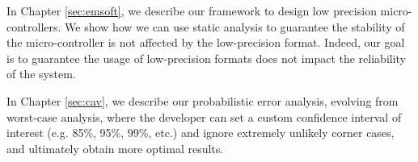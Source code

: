 %
%
%
%
In Chapter \ref{sec:emsoft}, we describe our framework to design low precision micro-controllers.
%
We show how we can use static analysis to guarantee the stability of the micro-controller is not affected by the low-precision format.
%
Indeed, our goal is to guarantee the usage of low-precision formats does not impact the reliability of the system.

%
%

%
%
%
In Chapter \ref{sec:cav}, we describe our probabilistic error analysis, evolving from worst-case analysis, where the developer can set a custom confidence interval of interest (e.g. 85\%, 95\%, 99\%, etc.) and ignore extremely unlikely corner cases, and ultimately obtain more optimal results.
%

\newpage



%
%
%

%
%
